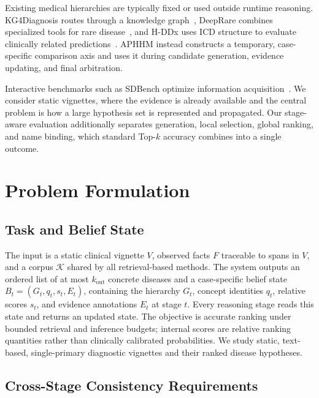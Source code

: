 \documentclass[letterpaper]{article} %
\begin{document}
Existing medical hierarchies are typically fixed or used outside runtime reasoning.
KG4Diagnosis routes through a knowledge graph~\cite{kg4diagnosis}, DeepRare combines specialized tools for rare disease~\cite{deeprare2025}, and H-DDx uses ICD structure to evaluate clinically related predictions~\cite{hddx2025}.
APHHM instead constructs a temporary, case-specific comparison axis and uses it during candidate generation, evidence updating, and final arbitration.

Interactive benchmarks such as SDBench optimize information acquisition~\cite{sdbench2025}.
We consider static vignettes, where the evidence is already available and the central problem is how a large hypothesis set is represented and propagated.
Our stage-aware evaluation additionally separates generation, local selection, global ranking, and name binding, which standard Top-$k$ accuracy combines into a single outcome.

\section{Problem Formulation}
\label{sec:problem}

\subsection{Task and Belief State}
\label{sec:task}

The input is a static clinical vignette $V$, observed facts $F$ traceable to spans in $V$, and a corpus $\mathcal{K}$ shared by all retrieval-based methods.
The system outputs an ordered list of at most $k_{\mathrm{out}}$ concrete diseases and a case-specific belief state
$B_t=(G_t,q_t,s_t,E_t)$, containing the hierarchy $G_t$, concept identities $q_t$, relative scores $s_t$, and evidence annotations $E_t$ at stage $t$.
Every reasoning stage reads this state and returns an updated state.
The objective is accurate ranking under bounded retrieval and inference budgets; internal scores are relative ranking quantities rather than clinically calibrated probabilities.
We study static, text-based, single-primary diagnostic vignettes and their ranked disease hypotheses.

\subsection{Cross-Stage Consistency Requirements}
\label{sec:dilemma}
\end{document}
